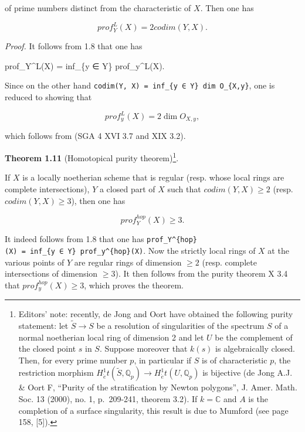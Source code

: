 \documentclass[
  11pt,
  a4paper,
]{book}
\newenvironment{Shaded}{}{}
\newcommand{\NormalTok}[1]{#1}
\begin{document}
of prime numbers distinct from the characteristic of \(X\). Then one has

\[ prof^{L}_{Y}(X) = 2 codim(Y, X). \]

\emph{Proof.} It follows from 1.8 that one has

\begin{Shaded}
\begin{Highlighting}[]
\NormalTok{prof\_Y\^{}L(X) = inf\_\{y ∈ Y\} prof\_y\^{}L(X).}
\end{Highlighting}
\end{Shaded}

Since on the other hand
\texttt{codim(Y,\ X)\ =\ inf\_\{y\ ∈\ Y\}\ dim\ O\_\{X,y\}}, one is
reduced to showing that

\[ prof^{L}_{y}(X) = 2 \dim O_{X,y}, \]

which follows from (SGA 4 XVI 3.7 and XIX 3.2).

\textbf{Theorem 1.11} (Homotopical purity theorem)\footnote{Editors'
  note: recently, de Jong and Oort have obtained the following purity
  statement: let \(\tilde{S}
  \to S\) be a resolution of singularities of the spectrum \(S\) of a
  normal noetherian local ring of dimension 2 and let \(U\) be the
  complement of the closed point \(s\) in \(S\). Suppose moreover that
  \(k(s)\) is algebraically closed. Then, for every prime number \(p\),
  in particular if \(S\) is of characteristic \(p\), the restriction
  morphism
  \(H^{1}_{\acute{e}}t(\tilde{S}, \mathbb{Q}_{p}) \to H^{1}_{\acute{e}}t(U, \mathbb{Q}_{p})\)
  is bijective (de Jong A.J. \& Oort F, ``Purity of the stratification
  by Newton polygons'', J. Amer. Math. Soc. 13 (2000), no. 1,
  p.~209-241, theorem 3.2). If \(k = \mathbb{C}\) and \(A\) is the
  completion of a surface singularity, this result is due to Mumford
  (see page 158, {[}5{]}).}.

If \(X\) is a locally noetherian scheme that is regular (resp. whose
local rings are complete intersections), \(Y\) a closed part of \(X\)
such that \(codim(Y, X) \geqslant 2\) (resp.
\(codim(Y, X) \geqslant 3\)), then one has

\[ prof^{hop}_{Y}(X) \geqslant 3. \]

It indeed follows from 1.8 that one has
\texttt{prof\_Y\^{}\{hop\}(X)\ =\ inf\_\{y\ ∈\ Y\}\ prof\_y\^{}\{hop\}(X)}.
Now the strictly local rings of \(X\) at the various points of \(Y\) are
regular rings of dimension \(\geqslant 2\) (resp. complete intersections
of dimension \(\geqslant 3\)). It then follows from the purity theorem X
3.4 that \(prof^{hop}_{y}(X) \geqslant 3\), which proves the theorem.
\end{document}
